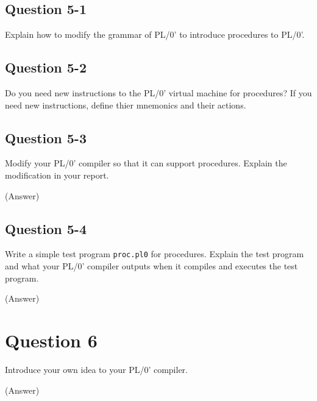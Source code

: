 \documentclass{article}
\begin{document}
\subsection*{Question 5-1}
Explain how to modify the grammar of PL/0' to introduce procedures to PL/0'.

\subsection*{Question 5-2}
Do you need new instructions to the PL/0' virtual machine for procedures?
If you need new instructions, define thier mnemonics and their actions. 


\subsection*{Question 5-3}
Modify your PL/0' compiler so that it can support procedures.
Explain the modification in your report.

\ifreport
(Answer)\\
\fi


\subsection*{Question 5-4}
Write a simple test program {\tt proc.pl0} for procedures.
Explain the test program and what your PL/0' compiler outputs when it
compiles and executes the test program.


\ifreport
(Answer)\\
\fi



\newpage
\section*{Question 6}
Introduce your own idea to your PL/0' compiler.

\ifreport
(Answer)\\
\fi



\ifreport
\else
\end{document}
